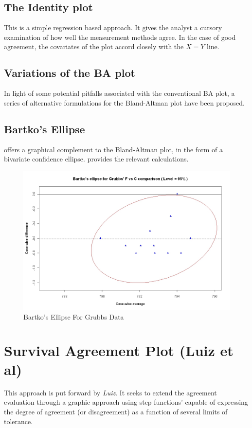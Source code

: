 \documentclass[Chap2main.tex]{subfiles}
\begin{document}
	
	
	

\subsection{The Identity plot} This is a simple regression based approach. It gives the analyst a cursory examination of how well the measurement methods agree. In the case of good agreement, the covariates of the plot accord closely with the $X=Y$ line.

\subsection{Variations of the BA plot}

In light of some potential pitfalls associated with the conventional BA plot, a series of alternative formulations for the Bland-Altman plot have been proposed.

\newpage
\subsection{Bartko's Ellipse}
\citet{Bartko} offers a graphical complement to the Bland-Altman
plot, in the form of a bivariate confidence ellipse.
\citet{AltmanEllipse} provides the relevant calculations.

\begin{figure}[h!]
	\includegraphics[width=130mm]{GrubbsBartko.jpeg}
	\caption{Bartko's Ellipse For Grubbs Data}\label{GrubbsBartko}
\end{figure}



\section{Survival Agreement Plot (Luiz et al)}
This approach is put forward by \textit{Luiz}. It seeks to extend the agreement evaluation through a graphic approach using step functions' capable of expressing the degree of agreement (or disagreement) as a function of several limits of tolerance.
\end{document}
